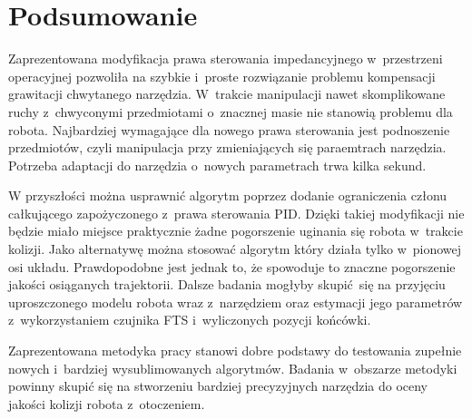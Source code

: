 
\chapter{Podsumowanie\label{chap:podsumowanie}}

Zaprezentowana modyfikacja prawa sterowania impedancyjnego w~przestrzeni operacyjnej pozwoliła na szybkie i~proste rozwiązanie problemu kompensacji grawitacji chwytanego narzędzia. W~trakcie manipulacji nawet skomplikowane ruchy z~chwyconymi przedmiotami o~znacznej masie nie stanowią problemu dla robota. Najbardziej wymagające dla nowego prawa sterowania jest podnoszenie przedmiotów, czyli manipulacja przy zmieniających się paraemtrach narzędzia. Potrzeba adaptacji do narzędzia o~nowych parametrach trwa kilka sekund. 


W przyszłości można usprawnić algorytm poprzez dodanie ograniczenia członu całkującego zapożyczonego z~prawa sterowania PID. Dzięki takiej modyfikacji nie będzie miało miejsce praktycznie żadne pogorszenie uginania się robota w~trakcie kolizji. Jako alternatywę można stosować algorytm który działa tylko w~pionowej osi układu. Prawdopodobne jest jednak to, że spowoduje to znaczne pogorszenie jakości osiąganych trajektorii.  Dalsze badania mogłyby skupić się na przyjęciu uproszczonego modelu robota wraz z~narzędziem oraz estymacji jego parametrów z~wykorzystaniem czujnika FTS i~wyliczonych pozycji końcówki.

Zaprezentowana metodyka pracy stanowi dobre podstawy do testowania zupełnie nowych i~bardziej wysublimowanych algorytmów.  Badania w~obszarze metodyki powinny skupić się na stworzeniu bardziej precyzyjnych narzędzia do oceny jakości kolizji robota z~otoczeniem.  